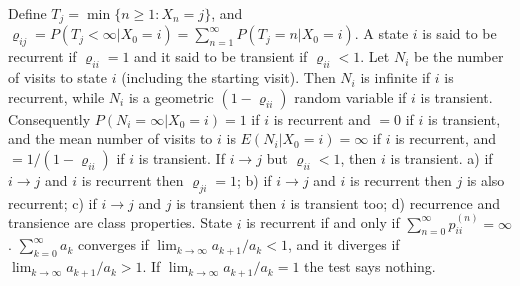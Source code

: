  Define $T_j = \min\{n \ge 1 : X_n = j\}$, and $\varrho_{ij} = P(T_j < \infty|X_0 = i) = \sum^\infty_{n=1}P(T_j = n| X_0 = i)$. A state $i$ is said to be recurrent if $\varrho_{ii} = 1$ and it said to be transient if $\varrho_{ii} < 1$.
 Let $N_i$ be the number of visits to state $i$ (including the starting visit). Then $N_i$ is infinite if $i$ is recurrent, while $N_i$ is a geometric $(1- \varrho_{ii})$ random variable if $i$ is transient. Consequently $P(N_i = \infty|X_0 = i) = 1$ if $i$ is recurrent and $= 0$ if $i$ is transient, and the mean number of visits to $i$ is $E(N_i|X_0 = i) = \infty$ if $i$ is recurrent, and $= 1/(1-\varrho_{ii})$ if $i$ is transient.
 If $i \to j$ but $\varrho_{ii} < 1$, then $i$ is transient.
 a) if $i \to j$ and $i$ is recurrent then $\varrho_{ji} = 1$; b) if $i \to j$ and $i$ is recurrent then $j$ is also recurrent; c) if $i \to j$ and $j$ is transient then $i$ is transient too; d) recurrence and transience are class properties.
 State $i$ is recurrent if and only if $\sum^{\infty}_{n=0} p^{(n)}_{ii} = \infty$.
 $\sum^{\infty}_{k=0} a_k$ converges if $\lim_{k\to \infty} a_{k+1}/a_k < 1$, and it diverges if $\lim_{k\to \infty} a_{k+1}/a_k > 1$. If $\lim_{k\to \infty} a_{k+1}/a_k = 1$ the test says nothing.

